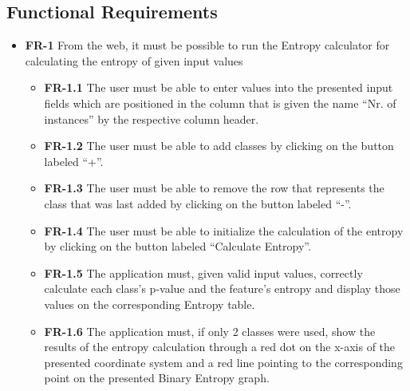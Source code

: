\subsection{Functional Requirements}
\begin{itemize}
    \item \textbf{FR-1} From the web, it must be possible to run the Entropy calculator for calculating the entropy of given input values
    \begin{itemize}
        \item \textbf{FR-1.1} The user must be able to enter values into the presented input fields which are positioned in the column that is given the name ``Nr. of instances'' by the respective column header.
        \item \textbf{FR-1.2} The user must be able to add classes by clicking on the button labeled ``+''.
        \item \textbf{FR-1.3} The user must be able to remove the row that represents the class that was last added by clicking on the button labeled ``-''.
        \item \textbf{FR-1.4} The user must be able to initialize the calculation of the entropy by clicking on the button labeled ``Calculate Entropy''.
        \item \textbf{FR-1.5} The application must, given valid input values, correctly calculate each class's p-value and the feature's entropy and display those values on the corresponding Entropy table.
        \item \textbf{FR-1.6} The application must, if only 2 classes were used, show the results of the entropy calculation through a red dot on the x-axis of the presented coordinate system and a red line pointing to the corresponding point on the presented Binary Entropy graph.
    \end{itemize}
\end{itemize}

